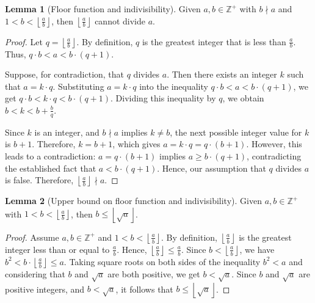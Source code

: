 \documentclass{article}
\theoremstyle{plain}
\theoremstyle{definition}
\newtheorem{lemma}{Lemma}
\newcommand{\Z}{\mathbb{Z}}
\begin{document}
\begin{lemma}[Floor function and indivisibility]
\label{lemma:floornondivisor}
Given $a,b \in \Z^{+}$ with \(b \nmid a\) and \( 1 < b < \left\lfloor \frac{a}{b} \right\rfloor \), then \(\left\lfloor \frac{a}{b} \right\rfloor \) cannot divide \(a\).
\end{lemma}
\begin{proof}
Let \(q = \left\lfloor \frac{a}{b} \right\rfloor\). By definition, \(q\) is the greatest integer that is less than \(\frac{a}{b}\). Thus, \(q \cdot b < a < b \cdot (q + 1)\).

Suppose, for contradiction, that \(q\) divides \(a\). Then there exists an integer \(k\) such that \(a = k \cdot q\). Substituting \(a = k \cdot q\) into the inequality \(q \cdot b < a < b \cdot (q + 1) \), we get \(q \cdot b < k \cdot q < b \cdot (q + 1) \). Dividing this inequality by \(q\), we obtain \(b < k < b + \frac{b}{q}\).

Since \(k\) is an integer, and \(b \nmid a\) implies \(k \neq b\), the next possible integer value for \(k\) is \(b + 1\). Therefore, \(k = b + 1\), which gives \(a = k \cdot q = q \cdot (b + 1)\). However, this leads to a contradiction: \(a = q \cdot (b + 1) \) implies \(a \geq b \cdot (q + 1) \), contradicting the established fact that \(a < b \cdot (q + 1) \). Hence, our assumption that \(q\) divides \(a\) is false. Therefore, \(\left\lfloor \frac{a}{b} \right\rfloor \nmid a\).
\end{proof}

\begin{lemma}[Upper bound on floor function and indivisibility]
\label{lemma:floornondivisorupperbound}
Given $a,b \in \Z^{+}$ with \( 1 < b < \left\lfloor \frac{a}{b} \right\rfloor \), then \(b \leq \left\lfloor \sqrt{a} \right\rfloor\).
\end{lemma}
\begin{proof}
Assume \( a, b \in \Z^{+} \) and \( 1 < b < \left\lfloor \frac{a}{b} \right\rfloor \). By definition, \( \left\lfloor \frac{a}{b} \right\rfloor \) is the greatest integer less than or equal to \( \frac{a}{b} \). Hence, \( \left\lfloor \frac{a}{b} \right\rfloor \leq \frac{a}{b} \). Since \( b < \left\lfloor \frac{a}{b} \right\rfloor \), we have \( b^2 < b \cdot \left\lfloor \frac{a}{b} \right\rfloor \leq a \). Taking square roots on both sides of the inequality \( b^2 < a \) and considering that \( b \) and \( \sqrt{a} \) are both positive, we get \( b < \sqrt{a} \). Since \( b \) and \( \sqrt{a} \) are positive integers, and \( b < \sqrt{a} \), it follows that \( b \leq \left\lfloor \sqrt{a} \right\rfloor \).
\end{proof}
\end{document}
